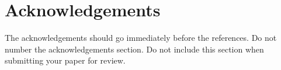 \documentclass[11pt]{article}
\begin{document}
\section*{Acknowledgements}

The acknowledgements should go immediately before the references.  Do
not number the acknowledgements section. Do not include this section
when submitting your paper for review.

\printbibliography
\end{document}
